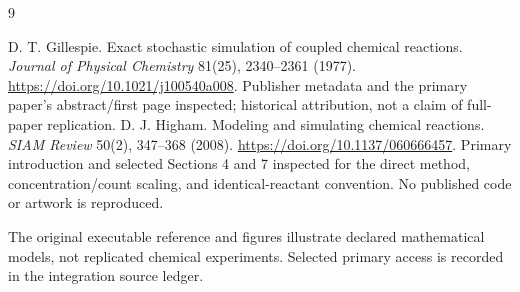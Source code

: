 \renewcommand{\bibname}{Sources and references}
\begin{thebibliography}{9}
 D. T. Gillespie.
Exact stochastic simulation of coupled chemical reactions.
\emph{Journal of Physical Chemistry} 81(25), 2340--2361 (1977).
\url{https://doi.org/10.1021/j100540a008}.
Publisher metadata and the primary paper's abstract/first page inspected;
historical attribution, not a claim of full-paper replication.
 D. J. Higham. Modeling and simulating chemical reactions.
\emph{SIAM Review} 50(2), 347--368 (2008).
\url{https://doi.org/10.1137/060666457}.
Primary introduction and selected Sections 4 and 7 inspected for the direct
method, concentration/count scaling, and identical-reactant convention.
No published code or artwork is reproduced.
\end{thebibliography}
The original executable reference and figures illustrate declared mathematical
models, not replicated chemical experiments. Selected primary access is recorded
in the integration source ledger.
